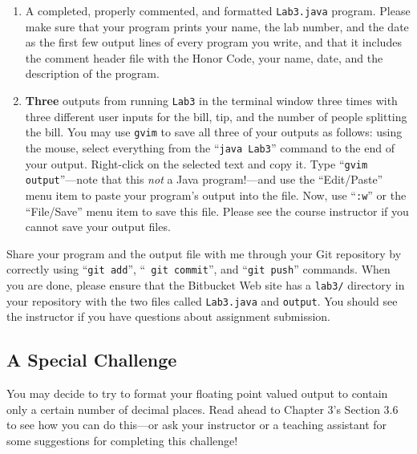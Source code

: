 \begin{enumerate}

        \item A completed, properly commented, and formatted {\tt Lab3.java} program. Please make sure that your program
          prints your name, the lab number, and the date as the first few output lines of every program you write, and
          that it includes the comment header file with the Honor Code, your name, date, and the description of the
          program.

        \item \textbf{Three} outputs from running {\tt Lab3} in the terminal window three times with three different
          user inputs for the bill, tip, and the number of people splitting the bill. You may use {\tt gvim} to save all
          three of your outputs as follows: using the mouse, select everything from the ``{\tt java Lab3}'' command to
          the end of your output.  Right-click on the selected text and copy it.  Type ``{\tt gvim output}''---note that
          this {\em not} a Java program!---and use the ``Edit/Paste'' menu item to paste your program's output into the
          file.  Now, use ``{\tt :w}'' or the ``File/Save'' menu item to save this file. Please see the course
          instructor if you cannot save your output files.

\end{enumerate}
\vspace{-0.1in}
Share your program and the output file with me through your Git repository by correctly using ``{\tt git add}'', ``{\tt
git commit}'', and ``{\tt git push}'' commands. When you are done, please ensure that the Bitbucket Web site has
a {\tt lab3/} directory in your repository with the two files called {\tt Lab3.java} and {\tt output}. You should see 
the instructor if you have questions about assignment submission.

\vspace{-0.1in}
\subsection*{A Special Challenge}

You may decide to try to format your floating point valued output to contain only a certain number of decimal places.
Read ahead to Chapter 3's Section 3.6 to see how you can do this---or ask your instructor or a teaching assistant for
some suggestions for completing this challenge!


